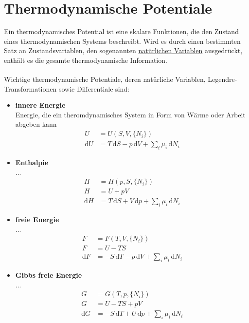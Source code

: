 \documentclass{article}
\newcommand{\diff}{\mathrm{d}}
\begin{document}
\section{Thermodynamische Potentiale}
Ein thermodynamisches Potential ist eine skalare Funktionen, die den Zustand eines thermodynamischen Systems beschreibt. Wird es durch einen bestimmten Satz an Zustandsvariablen, den sogenannten \underline{natürlichen Variablen} ausgedrückt, enthält es die gesamte thermodynamische Information.\\
\\
Wichtige thermodynamische Potentiale, deren natürliche Variablen, Legendre-Transformationen sowie Differentiale sind:
	\begin{itemize}
		\item \textbf{innere Energie}\\
		Energie, die ein theromdynamisches System in Form von Wärme oder Arbeit abgeben kann
			\begin{align}
				U &= U(S, V, \{N_i\}) \\
				\diff U &= T \, \diff S - p \, \diff V + \sum_i \mu_i \, \diff N_i
			\end{align}
		
		
		\item \textbf{Enthalpie}\\
		...
			\begin{align}
				H &= H(p, S, \{N_i\}) \\
				H &= U + p V \\
				\diff H &= T \, \diff S + V \, \diff p + \sum_i \mu_i \, \diff N_i
			\end{align}
		
		
		\item \textbf{freie Energie}\\
		...
			\begin{align}
				F &= F(T, V, \{N_i\}) \\
				F &= U - TS \\
				\diff F &= -S \, \diff T - p \, \diff V + \sum_i \mu_i \, \diff N_i
			\end{align}
		
		
		\item \textbf{Gibbs freie Energie}\\
		...
			\begin{align}
				G &= G(T, p, \{N_i\}) \\
				G &= U - TS + pV \\
				\diff G &= -S \, \diff T + U \, \diff p + \sum_i \mu_i \, \diff N_i
			\end{align}
	\end{itemize}
\end{document}

